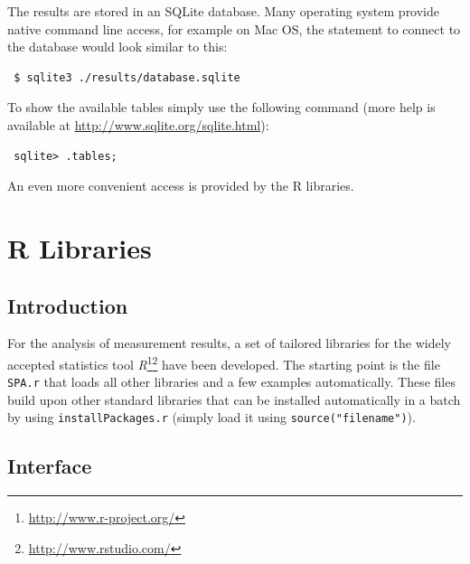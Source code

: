 The results are stored in an SQLite database. Many operating system provide native command line access, for example on Mac OS, the statement to connect to the database would look similar to this:
\begin{lstlisting}
 $ sqlite3 ./results/database.sqlite
\end{lstlisting}

To show the available tables simply use the following command (more help is available at \url{http://www.sqlite.org/sqlite.html}):
\begin{lstlisting} 
 sqlite> .tables;
\end{lstlisting}

An even more convenient access is provided by the R libraries.

\chapter{R Libraries}

\section{Introduction}
\label{sec:RLIbraries:Introduction}

For the analysis of measurement results, a set of tailored libraries for the widely accepted statistics tool \emph{R}\footnote{\url{http://www.r-project.org/}}\footnote{\url{http://www.rstudio.com/}} have been developed. The starting point is the file \texttt{SPA.r} that loads all other libraries and a few examples automatically. These files build upon other standard libraries that can be installed automatically in a batch by using \texttt{installPackages.r} (simply load it using \texttt{source("filename")}).

\section{Interface}

